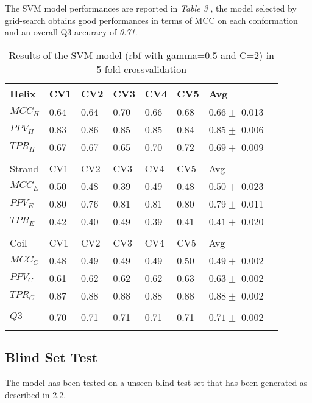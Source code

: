 \documentclass[a4paper,twocolumn]{article}
\begin{document}
The SVM model performances are reported in \emph{Table 3} , the model selected by
grid-search obtains good performances in terms of MCC on each conformation and
an overall Q3 accuracy of \emph{0.71}.


\hspace{-3cm}
\begin{table}[htbp]
\caption{Results of the SVM model (rbf with gamma=0.5 and C=2) in 5-fold crossvalidation}
\centering
\begin{tabular}{p{0.8cm}p{0.5cm}p{0.5cm}p{0.5cm}p{0.5cm}p{0.5cm}ll}
Helix & CV1 & CV2 & CV3 & CV4 & CV5 & Avg\\
\hline
\(MCC_H\) & 0.64 & 0.64 & 0.70 & 0.66 & 0.68 & \(0.66 \pm\) 0.013\\
\(PPV_H\) & 0.83 & 0.86 & 0.85 & 0.85 & 0.84 & \(0.85 \pm\) 0.006\\
\(TPR_H\) & 0.67 & 0.67 & 0.65 & 0.70 & 0.72 & \(0.69 \pm\) 0.009\\
 &  &  &  &  &  & \\
Strand & CV1 & CV2 & CV3 & CV4 & CV5 & Avg\\
\hline
\(MCC_E\) & 0.50 & 0.48 & 0.39 & 0.49 & 0.48 & \(0.50 \pm\) 0.023\\
\(PPV_E\) & 0.80 & 0.76 & 0.81 & 0.81 & 0.80 & \(0.79 \pm\) 0.011\\
\(TPR_E\) & 0.42 & 0.40 & 0.49 & 0.39 & 0.41 & \(0.41 \pm\) 0.020\\
 &  &  &  &  &  & \\
Coil & CV1 & CV2 & CV3 & CV4 & CV5 & Avg\\
\hline
\(MCC_C\) & 0.48 & 0.49 & 0.49 & 0.49 & 0.50 & \(0.49 \pm\) 0.002\\
\(PPV_C\) & 0.61 & 0.62 & 0.62 & 0.62 & 0.63 & \(0.63 \pm\) 0.002\\
\(TPR_C\) & 0.87 & 0.88 & 0.88 & 0.88 & 0.88 & \(0.88 \pm\) 0.002\\
 &  &  &  &  &  & \\
\hline
\(Q3\) & 0.70 & 0.71 & 0.71 & 0.71 & 0.71 & \(0.71 \pm\) 0.002\\
 &  &  &  &  &  & \\
\end{tabular}
\end{table}

\subsection{Blind Set Test}
\label{sec:org3db8f51}
The model has been tested on a unseen blind test set that has been generated as
described in 2.2.
\end{document}
